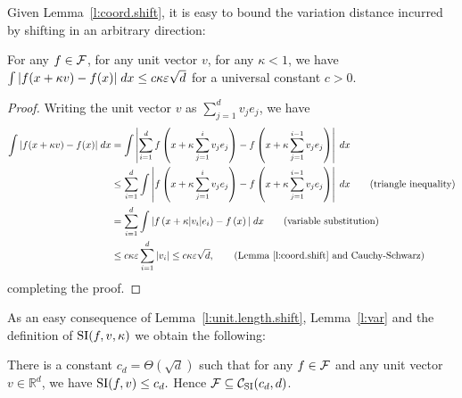 \ignore{
}

Given Lemma~\ref{l:coord.shift}, it is easy to bound the variation distance incurred by shifting in an arbitrary direction:
\begin{lemma}
\label{l:unit.length.shift}
For any $f \in {\cal F}$, for any unit vector $v$, for any $\kappa < 1$, we have
$
\int | f(x + \kappa v) - f(x) | \;dx \leq c \kappa \varepsilon \sqrt{d}
$
for a universal constant $c>0.$
\end{lemma}
\begin{proof}
Writing the unit vector $v$ as $\sum_{j=1}^d v_j e_j$, we have
\begin{align*}
\int | f(x + \kappa v) - f(x) | \;dx 
& = \int \left| \sum_{i=1}^d 
          f\left(x + \kappa \sum_{j=1}^i v_j e_j \right) - f\left(x + \kappa \sum_{j=1}^{i-1} v_j e_j \right) \right| \;dx  \\
& \leq \sum_{i=1}^d \int \left| f\left(x + \kappa \sum_{j=1}^i v_j e_j\right) - f\left(x + \kappa \sum_{j=1}^{i-1} v_je_j\right) \right| \;dx \tag{triangle inequality}\\
& = \sum_{i=1}^d \int | f\left(x + \kappa |v_i| e_i\right) - f\left(x \right) | \;dx \tag{variable substitution} \\
& \leq {c \kappa \eps} \sum_{i=1}^d | v_i | \leq c \kappa \eps \sqrt{d}, \tag{Lemma~\ref{l:coord.shift} and Cauchy-Schwarz}\\
\end{align*}
completing the proof.
\end{proof}

As an easy consequence of Lemma~\ref{l:unit.length.shift}, Lemma~\ref{l:var} and the definition of ${\mathrm{SI}}(f,v,\kappa)$ we obtain the following:

\begin{corollary} \label{cor:si}
There is a constant $c_d{=\Theta(\sqrt{d})}$ such that for any $f \in {\cal F}$ and any unit vector $v\in \mathbb{R}^d$, we have ${\mathrm{SI}}(f,v) \leq
c_d.$  Hence ${\cal F} \subseteq {\cal C}_{\mathrm{SI}}(c_d,d)$.
\end{corollary}



